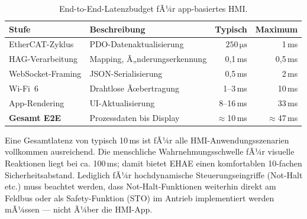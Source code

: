 ﻿\documentclass[12pt,a4paper]{article}
\begin{document}
\begin{table}[H]
\centering
\caption{End-to-End-Latenzbudget fÃ¼r app-basiertes HMI.}
\label{tab:latency}
\begin{tabularx}{\textwidth}{lXrr}
\toprule
\textbf{Stufe}         & \textbf{Beschreibung}          & \textbf{Typisch}             & \textbf{Maximum} \\
\midrule
EtherCAT-Zyklus        & PDO-Datenaktualisierung        & $250\,\si{\micro\second}$    & 1\,ms \\
HAG-Verarbeitung       & Mapping, Ã„nderungserkennung    & 0{,}1\,ms                   & 0{,}5\,ms \\
WebSocket-Framing      & JSON-Serialisierung            & 0{,}5\,ms                   & 2\,ms \\
Wi-Fi~6                & Drahtlose Ãœbertragung          & 1--3\,ms                    & 10\,ms \\
App-Rendering          & UI-Aktualisierung              & 8--16\,ms                   & 33\,ms \\
\midrule
\textbf{Gesamt E2E}    & Prozessdaten bis Display       & $\approx$10\,ms             & $\approx$47\,ms \\
\bottomrule
\end{tabularx}
\end{table}

Eine Gesamtlatenz von typisch 10\,ms ist fÃ¼r alle HMI-Anwendungsszenarien vollkommen
ausreichend. Die menschliche Wahrnehmungsschwelle fÃ¼r visuelle Reaktionen liegt bei ca.
100\,ms; damit bietet EHAE einen komfortablen 10-fachen Sicherheitsabstand. Lediglich
fÃ¼r hochdynamische Steuerungseingriffe (Not-Halt etc.) muss beachtet werden, dass
Not-Halt-Funktionen weiterhin direkt am Feldbus oder als Safety-Funktion (STO) im Antrieb
implementiert werden mÃ¼ssen --- nicht Ã¼ber die HMI-App.
\end{document}
